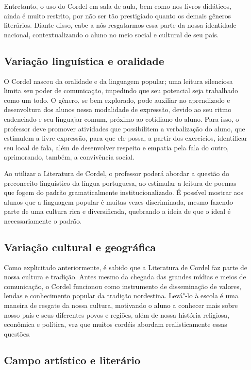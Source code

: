 \documentclass[12pt]{extarticle}
\begin{document}
Entretanto, o uso do Cordel em sala de aula, bem como nos livros didáticos,
ainda é muito restrito, por não ser tão prestigiado quanto os demais gêneros
literários. Diante disso, cabe a nós resgatarmos essa parte da nossa identidade
nacional, contextualizando o aluno no meio social e cultural de seu país.

\subsection{Variação linguística e oralidade}

O Cordel nasceu da oralidade e da linguagem popular; uma leitura silenciosa
limita seu poder de comunicação, impedindo que seu potencial seja trabalhado
como um todo. O gênero, se bem explorado, pode auxiliar no aprendizado
e desenvoltura dos alunos nessa modalidade de expressão, devido ao seu ritmo
cadenciado e seu linguajar comum, próximo ao cotidiano do aluno. Para isso,
o professor deve promover atividades que possibilitem a verbalização do aluno,
que estimulem a livre expressão, para que ele possa, a partir dos exercícios,
identificar seu local de fala, além de desenvolver respeito e empatia pela fala
do outro, aprimorando, também, a convivência social.

Ao utilizar a Literatura de Cordel, o professor poderá abordar a questão do
preconceito linguístico da língua portuguesa, ao estimular a leitura de poemas
que fogem do padrão gramaticalmente institucionalizado. É possível mostrar aos
alunos que a linguagem popular é muitas vezes discriminada, mesmo fazendo parte
de uma cultura rica e diversificada, quebrando a ideia de que o ideal
é necessariamente o padrão.

\subsection{Variação cultural e geográfica}

Como explicitado anteriormente, é sabido que a Literatura de Cordel faz parte
de nossa cultura e tradição. Antes mesmo da chegada das grandes mídias e meios
de comunicação, o Cordel funcionou como instrumento de disseminação de valores,
lendas e conhecimento popular da tradição nordestina. Levá"-lo à escola é uma
maneira de resgate da nossa cultura, motivando o aluno a conhecer mais sobre
nosso país e seus diferentes povos e regiões, além de nossa história religiosa,
econômica e política, vez que muitos cordéis abordam realisticamente essas
questões.

\subsection{Campo artístico e literário}
\end{document}
